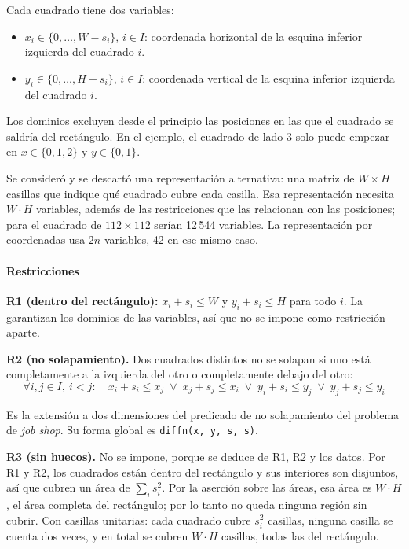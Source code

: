 Cada cuadrado tiene dos variables:

\begin{itemize}
    \item $x_i \in \{0, \dots, W - s_i\}$, $i \in I$: coordenada horizontal de la esquina inferior izquierda del cuadrado $i$.
    \item $y_i \in \{0, \dots, H - s_i\}$, $i \in I$: coordenada vertical de la esquina inferior izquierda del cuadrado $i$.
\end{itemize}

Los dominios excluyen desde el principio las posiciones en las que el cuadrado se saldría del rectángulo. En el ejemplo, el cuadrado de lado 3 solo puede empezar en $x \in \{0, 1, 2\}$ y $y \in \{0, 1\}$.

Se consideró y se descartó una representación alternativa: una matriz de $W \times H$ casillas que indique qué cuadrado cubre cada casilla. Esa representación necesita $W \cdot H$ variables, además de las restricciones que las relacionan con las posiciones; para el cuadrado de $112 \times 112$ serían 12\,544 variables. La representación por coordenadas usa $2n$ variables, 42 en ese mismo caso.

\paragraph{Restricciones}

\textbf{R1 (dentro del rectángulo):} $x_i + s_i \le W$ y $y_i + s_i \le H$ para todo $i$. La garantizan los dominios de las variables, así que no se impone como restricción aparte.

\textbf{R2 (no solapamiento).} Dos cuadrados distintos no se solapan si uno está completamente a la izquierda del otro o completamente debajo del otro:
\[
    \forall i, j \in I,\ i < j:\quad x_i + s_i \le x_j \;\lor\; x_j + s_j \le x_i \;\lor\; y_i + s_i \le y_j \;\lor\; y_j + s_j \le y_i
\]

Es la extensión a dos dimensiones del predicado de no solapamiento del problema de \textit{job shop}. Su forma global es \texttt{diffn(x, y, s, s)}.

\textbf{R3 (sin huecos).} No se impone, porque se deduce de R1, R2 y los datos. Por R1 y R2, los cuadrados están dentro del rectángulo y sus interiores son disjuntos, así que cubren un área de $\sum_i s_i^2$. Por la aserción sobre las áreas, esa área es $W \cdot H$, el área completa del rectángulo; por lo tanto no queda ninguna región sin cubrir. Con casillas unitarias: cada cuadrado cubre $s_i^2$ casillas, ninguna casilla se cuenta dos veces, y en total se cubren $W \cdot H$ casillas, todas las del rectángulo.

